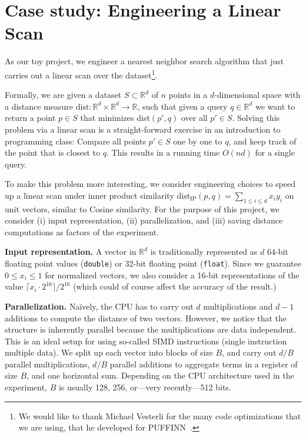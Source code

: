 \documentclass{llncs}
\newcommand{\myparagraph}[1]{\noindent \textbf{#1}}
\begin{document}
\section{Case study: Engineering a Linear Scan}

As our toy project, we engineer a nearest neighbor search algorithm that just carries out a linear scan over the dataset\footnote{We would like to thank Michael Vesterli for the many code optimizations that we are using, that he developed for PUFFINN~\cite{puffinn}.}.

Formally, we are given a dataset $S \subset \mathbb{R}^d$ of $n$ points in a $d$-dimensional space with a distance measure $\text{dist}\colon \mathbb{R}^d \times \mathbb{R}^d \rightarrow \mathbb{R}$, such that given a query $q \in \mathbb{R}^d$ we want to return a point $p \in S$ that minimizes dist$(p', q)$ over all $p' \in S$.
Solving this problem via a linear scan is a straight-forward exercise in an introduction to programming class: Compare all points $p' \in S$ one by one to $q$, and keep track of the point that is closest to $q$. This results in a running time $O(nd)$ for a single query.

To make this problem more interesting, we consider engineering choices to speed up a linear scan under inner product similarity $\text{dist}_{\text{IP}}(p,q) = \sum_{1 \leq i \leq d} x_i y_i$ on unit vectors, similar to Cosine similarity.
For the purpose of this project, we consider (i) input representation, (ii) parallelization, and (iii) saving distance computations as factors of the experiment.

\myparagraph{Input representation.}
A vector in $\mathbb{R}^d$ is traditionally represented as $d$ 64-bit floating point values (\texttt{double}) or 32-bit floating point (\texttt{float}). Since we guarantee $0 \leq x_i \leq 1$ for normalized vectors, we also consider a 16-bit representations of the value $\lceil x_i \cdot 2^{16} \rceil / 2^{16}$ (which could of course affect the accuracy of the result.)

\myparagraph{Parallelization.}
Naïvely, the CPU has to carry out $d$ multiplications and $d-1$ additions to compute the distance of two vectors.
However, we notice that the structure is inherently parallel because the multiplications are data independent. This is an ideal setup for using so-called SIMD instructions (single instruction multiple data). 
We split up each vector into blocks of size $B$, and carry out $d/B$ parallel multiplications, $d/B$ parallel additions to aggregate terms in a register of size $B$, and one horizontal sum. 
Depending on the CPU architecture used in the experiment, $B$ is usually 128, 256, or---very recently---512 bits.
\end{document}

